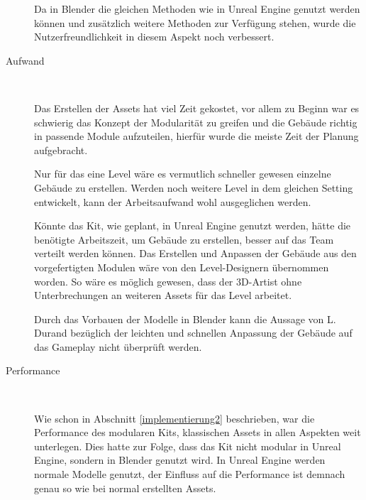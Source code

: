 \begin{description}
\par
Da in Blender die gleichen Methoden wie in Unreal Engine genutzt werden können und zusätzlich weitere Methoden zur Verfügung stehen, wurde die Nutzerfreundlichkeit in diesem Aspekt noch verbessert.
\item[Aufwand]~\par     
Das Erstellen der Assets hat viel Zeit gekostet, vor allem zu Beginn war es schwierig das Konzept der Modularität zu greifen und die Gebäude richtig in passende Module aufzuteilen, hierfür wurde die meiste Zeit der Planung aufgebracht.
\par
Nur für das eine Level wäre es vermutlich schneller gewesen einzelne Gebäude zu erstellen. Werden noch weitere Level in dem gleichen Setting entwickelt, kann der Arbeitsaufwand wohl ausgeglichen werden.
\par
Könnte das Kit, wie geplant, in Unreal Engine genutzt werden, hätte die benötigte Arbeitszeit, um Gebäude zu erstellen, besser auf das Team verteilt werden können. Das Erstellen und Anpassen der Gebäude aus den vorgefertigten Modulen wäre von den Level-Designern übernommen worden. So wäre es möglich gewesen, dass der 3D-Artist ohne Unterbrechungen an weiteren Assets für das Level arbeitet.
\par
Durch das Vorbauen der Modelle in Blender kann die Aussage von L. Durand  bezüglich der leichten und schnellen Anpassung der Gebäude auf das Gameplay nicht überprüft werden.
\item[Performance]~\par
Wie schon in Abschnitt \ref{implementierung2} beschrieben, war die Performance des modularen Kits, klassischen Assets in allen Aspekten weit unterlegen. Dies hatte zur Folge, dass das Kit nicht modular in Unreal Engine, sondern in Blender genutzt wird. In Unreal Engine werden normale Modelle genutzt, der Einfluss auf die Performance ist demnach genau so wie bei normal erstellten Assets.	
\end{description}